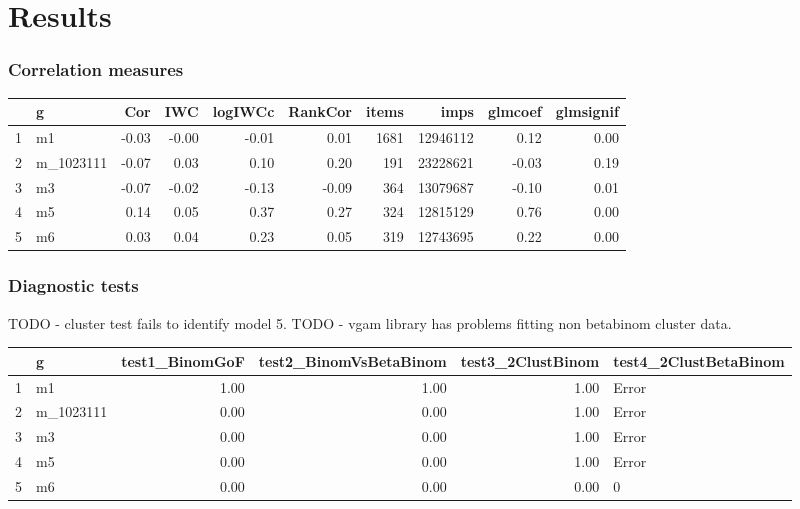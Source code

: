 \documentclass[11pt,a4,singlespacing,titlepagenumber=on]{scrreprt}
\numberwithin{equation}{chapter} %
\theoremstyle{remark}
\begin{document}
\chapter{Results}

\subsection{Correlation measures}

\begin{table}[ht]
\centering
\begin{tabular}{rlrrrrrrrr}
  \hline
 & g & Cor & IWC & logIWCc & RankCor & items & imps & glmcoef & glmsignif \\ 
  \hline
1 & m1 & -0.03 & -0.00 & -0.01 & 0.01 & 1681 & 12946112 & 0.12 & 0.00 \\ 
  2 & m\_1023111 & -0.07 & 0.03 & 0.10 & 0.20 & 191 & 23228621 & -0.03 & 0.19 \\ 
  3 & m3 & -0.07 & -0.02 & -0.13 & -0.09 & 364 & 13079687 & -0.10 & 0.01 \\ 
  4 & m5 & 0.14 & 0.05 & 0.37 & 0.27 & 324 & 12815129 & 0.76 & 0.00 \\ 
  5 & m6 & 0.03 & 0.04 & 0.23 & 0.05 & 319 & 12743695 & 0.22 & 0.00 \\ 
   \hline
\end{tabular}
\end{table}


\subsection{Diagnostic tests}

TODO - cluster test fails to identify model 5.
TODO - vgam library has problems fitting non betabinom cluster data.
\begin{table}[ht]
\centering
\begin{tabular}{rlrrrl}
  \hline
 & g & test1\_BinomGoF & test2\_BinomVsBetaBinom & test3\_2ClustBinom & test4\_2ClustBetaBinom \\ 
  \hline
1 & m1 & 1.00 & 1.00 & 1.00 & Error \\ 
  2 & m\_1023111 & 0.00 & 0.00 & 1.00 & Error \\ 
  3 & m3 & 0.00 & 0.00 & 1.00 & Error \\ 
  4 & m5 & 0.00 & 0.00 & 1.00 & Error \\ 
  5 & m6 & 0.00 & 0.00 & 0.00 & 0 \\ 
   \hline
\end{tabular}
\end{table}
\end{document}
